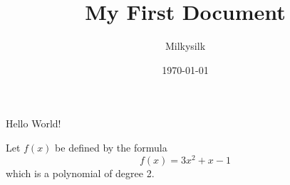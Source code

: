 \documentclass{ctexbook}  %
\title{My First Document}
\author{Milkysilk}
\date{\today}
\begin{document}
    \maketitle  %

    Hello World!

    Let $f(x)$ be defined by the formula $$f(x)=3x^2+x-1$$ which is a polynomial of degree 2.
\end{document}
